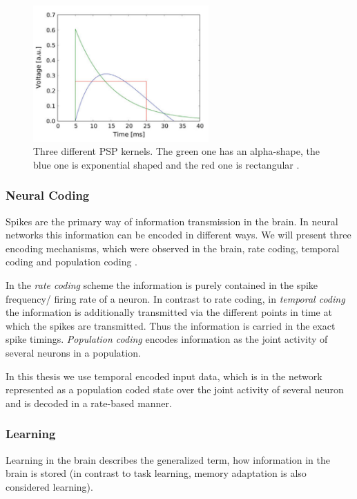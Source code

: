 \begin{figure}
	\centering
    	\includegraphics[width=0.6\textwidth]{imgs/psp_kernel.png} 
    \caption{Three different PSP kernels. The green one has an alpha-shape, the blue one is exponential shaped and the red one is rectangular \cite{Petrovici2016}. }
	\label{fig:pspkernels}
\end{figure}

\subsubsection{Neural Coding}

Spikes are the primary way of information transmission in the brain.
In neural networks this information can be encoded in different ways.
We will present three encoding mechanisms, which were observed in the brain, rate coding, temporal coding and population coding \cite{Meftah2013}.

In the \textit{rate coding} scheme the information is purely contained in the spike frequency/ firing rate of a neuron.
In contrast to rate coding, in \textit{temporal coding} the information is additionally transmitted via the different points in time at which the spikes are transmitted. 
Thus the information is carried in the exact spike timings.
\textit{Population coding} encodes information as the joint activity of several neurons in a population.  

In this thesis we use temporal encoded input data, which is in the network represented as a population coded state over the joint activity of several neuron and is decoded in a rate-based manner. 

\subsubsection{Learning}

Learning in the brain describes the generalized term, how information in the brain is stored (in contrast to task learning, memory adaptation is also considered learning).

